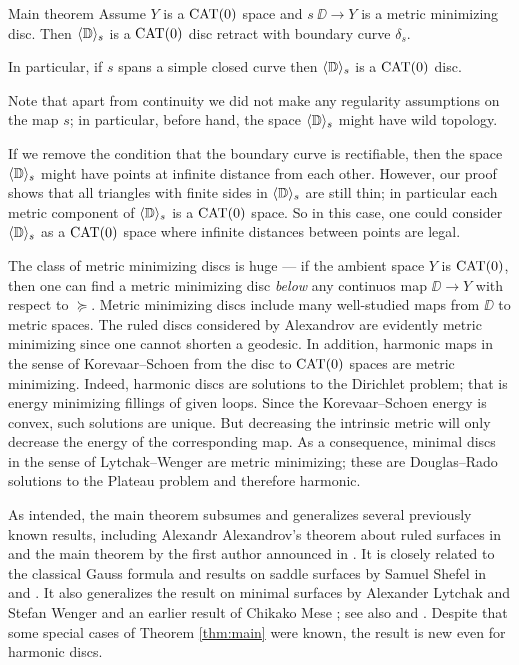\documentclass{article}
\begin{document}
\begin{thm}{Main theorem}\label{thm:main}
Assume $Y$ is a $\mathop{\rm CAT}\nolimits(0)$ space and $s\:\DD\to Y$ is a metric minimizing disc.
Then $\langle\mathbb{D}\rangle_s$ is a $\mathop{\rm CAT}\nolimits(0)$ disc retract with boundary curve $\delta_s$.

In particular, if $s$ spans a simple closed curve then $\langle\mathbb{D}\rangle_s$ is a $\mathop{\rm CAT}\nolimits(0)$ disc.
\end{thm}



Note that apart from continuity we did not make any regularity assumptions on the map $s$;
in particular, before hand, the space $\langle\mathbb{D}\rangle_s$ might have wild topology.

If we remove the condition that the boundary curve is rectifiable, then the space $\langle\mathbb{D}\rangle_s$ might have points at infinite distance from each other.
However, our proof shows that all triangles with finite sides in $\langle\mathbb{D}\rangle_s$ are still thin; 
in particular each metric component of $\langle\mathbb{D}\rangle_s$ is a $\mathop{\rm CAT}\nolimits(0)$ space.
So in this case, one could consider $\langle\mathbb{D}\rangle_s$ as a $\mathop{\rm CAT}\nolimits(0)$ space where infinite distances between points are legal.


The class of metric minimizing discs is huge --- if the ambient space $Y$ is $\mathop{\rm CAT}\nolimits(0)$, then one can find a metric minimizing  disc \emph{below} 
any continuos map $\DD\to Y$ with respect to $\succcurlyeq$. 
Metric minimizing discs include many well-studied maps from $\DD$ to metric spaces.
The ruled discs considered by Alexandrov \cite{A} are evidently metric minimizing since one cannot shorten a geodesic. 
In addition, harmonic maps in the sense of Korevaar--Schoen \cite{KS} from the disc to $\mathop{\rm CAT}\nolimits(0)$ spaces are metric minimizing.
Indeed, harmonic discs are solutions to the Dirichlet problem;
that is energy minimizing fillings of given loops.
Since the Korevaar--Schoen energy is convex, such solutions are unique. But decreasing the intrinsic metric will only decrease the energy of the corresponding map.
As a consequence, minimal discs in the sense of Lytchak--Wenger \cite{LW} are metric minimizing;
these are Douglas--Rado solutions to the Plateau problem and therefore harmonic. 








As intended, the main theorem subsumes and generalizes several previously known results, including Alexandr Alexandrov's theorem about ruled surfaces in \cite{A} and 
the main theorem by the first author announced in \cite{petrunin-metric-min}.
It is closely related to the classical Gauss formula and results on saddle surfaces by Samuel Shefel in \cite{shefel-2D} and \cite{shefel-3D}.
It also generalizes the result on minimal surfaces by Alexander Lytchak and Stefan Wenger 
\cite[Theorem 1.2]{LW5}  and an earlier result of Chikako Mese \cite{mese};
see also \cite[Chapter 4]{akp} and \cite{petrunin-stadler}. 
Despite that some special cases of Theorem \ref{thm:main} were known, the result is new even for harmonic discs.
\end{document}
